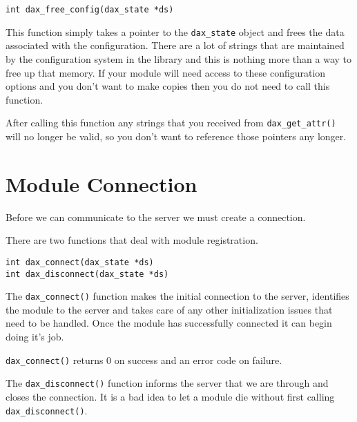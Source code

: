 \begin{verbatim}
int dax_free_config(dax_state *ds)
\end{verbatim}

This function simply takes a pointer to the \verb|dax_state| object and frees
the data associated with the configuration.  There are a lot of strings that are
maintained by the configuration system in the library and this is nothing more
than a way to free up that memory.  If your module will need access to these
configuration options and you don't want to make copies then you do not need to
call this function.

After calling this function any strings that you received from
\verb|dax_get_attr()| will no longer be valid, so you don't want to reference
those pointers any longer.

\section{Module Connection}
Before we can communicate to the server we must create a connection.

There are two functions that deal with module registration.
\begin{verbatim}
int dax_connect(dax_state *ds)
int dax_disconnect(dax_state *ds)
\end{verbatim}

The \verb|dax_connect()| function makes the
initial connection to the server, identifies the module to the server and takes
care of any other initialization issues that need to be handled.  Once the
module has successfully connected it can begin doing it's job.

\verb|dax_connect()| returns 0 on success and an error code on failure.

The \verb|dax_disconnect()| function informs
the server that we are through and closes the connection.  It is a bad idea to
let a module die without first calling \verb|dax_disconnect()|.
